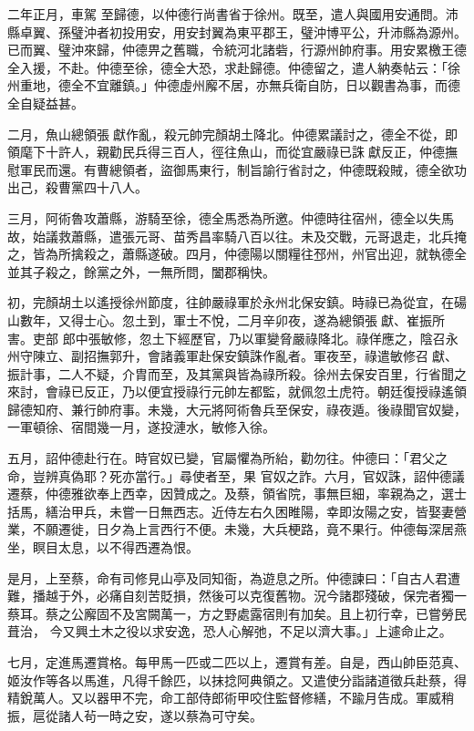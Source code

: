 \begin{pinyinscope}
 二年正月，車駕
 至歸德，以仲德行尚書省于徐州。既至，遣人與國用安通問。沛縣卓翼、孫璧沖者初投用安，用安封翼為東平郡王，璧沖博平公，升沛縣為源州。已而翼、璧沖來歸，仲德畀之舊職，令統河北諸砦，行源州帥府事。用安累檄王德全入援，不赴。仲德至徐，德全大恐，求赴歸德。仲德留之，遣人納奏帖云：「徐州重地，德全不宜離鎮。」仲德虛州廨不居，亦無兵衛自防，日以觀書為事，而德全自疑益甚。



 二月，魚山總領張獻作亂，殺元帥完顏胡土降北。仲德累議討之，德全不從，即領麾下十許人，親勸民兵得三百人，徑往魚山，而從宜嚴祿已誅獻反正，仲德撫
 慰軍民而還。有曹總領者，盜御馬東行，制旨諭行省討之，仲德既殺賊，德全欲功出己，殺曹黨四十八人。



 三月，阿術魯攻蕭縣，游騎至徐，德全馬悉為所邀。仲德時往宿州，德全以失馬故，始議救蕭縣，遣張元哥、苗秀昌率騎八百以往。未及交戰，元哥退走，北兵掩之，皆為所擒殺之，蕭縣遂破。四月，仲德陽以關糧往邳州，州官出迎，就執德全並其子殺之，餘黨之外，一無所問，闔郡稱快。



 初，完顏胡土以遙授徐州節度，往帥嚴祿軍於永州北保安鎮。時祿已為從宜，在碭山數年，又得士心。忽土到，軍士不悅，二月辛卯夜，遂為總領張獻、崔振所害。吏部
 郎中張敏修，忽土下經歷官，乃以軍變脅嚴祿降北。祿佯應之，陰召永州守陳立、副招撫郭升，會諸義軍赴保安鎮誅作亂者。軍夜至，祿遣敏修召獻、振計事，二人不疑，介胄而至，及其黨與皆為祿所殺。徐州去保安百里，行省聞之來討，會祿已反正，乃以便宜授祿行元帥左都監，就佩忽土虎符。朝廷復授祿遙領歸德知府、兼行帥府事。未幾，大元將阿術魯兵至保安，祿夜遁。後祿聞官奴變，一軍頓徐、宿間幾一月，遂投漣水，敏修入徐。



 五月，詔仲德赴行在。時官奴已變，官屬懼為所紿，勸勿往。仲德曰：「君父之命，豈辨真偽耶？死亦當行。」尋使者至，果
 官奴之詐。六月，官奴誅，詔仲德議遷蔡，仲德雅欲奉上西幸，因贊成之。及蔡，領省院，事無巨細，率親為之，選士括馬，繕治甲兵，未嘗一日無西志。近侍左右久困睢陽，幸即汝陽之安，皆娶妻營業，不願遷徙，日夕為上言西行不便。未幾，大兵梗路，竟不果行。仲德每深居燕坐，瞑目太息，以不得西遷為恨。



 是月，上至蔡，命有司修見山亭及同知衙，為遊息之所。仲德諫曰：「自古人君遭難，播越于外，必痛自刻苦貶損，然後可以克復舊物。況今諸郡殘破，保完者獨一蔡耳。蔡之公廨固不及宮闕萬一，方之野處露宿則有加矣。且上初行幸，已嘗勞民葺治，
 今又興土木之役以求安逸，恐人心解弛，不足以濟大事。」上遽命止之。



 七月，定進馬遷賞格。每甲馬一匹或二匹以上，遷賞有差。自是，西山帥臣范真、姬汝作等各以馬進，凡得千餘匹，以抹捻阿典領之。又遣使分詣諸道徵兵赴蔡，得精銳萬人。又以器甲不完，命工部侍郎術甲咬住監督修繕，不踰月告成。軍威稍振，扈從諸人茍一時之安，遂以蔡為可守矣。




\end{pinyinscope}
